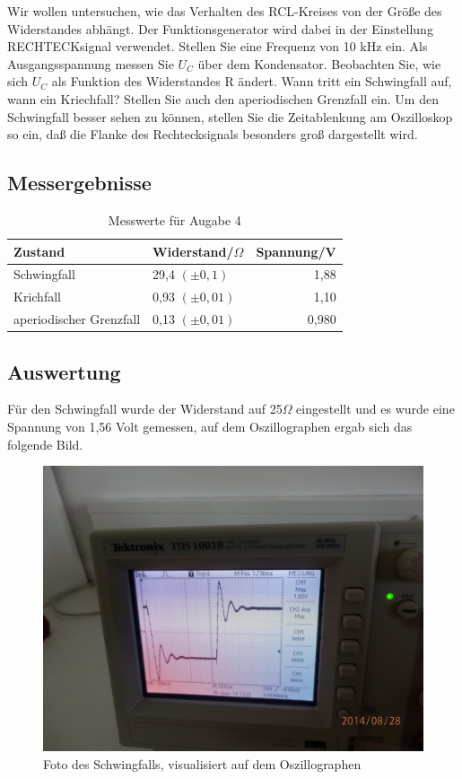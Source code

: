 \documentclass[12pt]{scrartcl}
\begin{document}
Wir wollen untersuchen, wie das Verhalten des RCL-Kreises von der Größe des Widerstandes abhängt. Der Funktionsgenerator wird dabei in der Einstellung RECHTECKsignal verwendet. Stellen Sie eine Frequenz von 10 kHz ein. Als Ausgangsspannung messen Sie
$U_C$ über dem Kondensator. Beobachten Sie, wie sich $U_C$
als Funktion des Widerstandes
R ändert. Wann tritt ein Schwingfall auf, wann ein Kriechfall? Stellen Sie auch den
aperiodischen Grenzfall ein. Um den Schwingfall besser sehen zu können, stellen Sie die Zeitablenkung am Oszilloskop so ein, daß die Flanke des Rechtecksignals besonders groß dargestellt wird.
\subsection{Messergebnisse}
\begin{table}[htbp]
 \centering
\caption{Messwerte für Augabe 4}
\begin{tabular}{|l|l|r|}
\hline
Zustand & Widerstand/$\Omega$ & \multicolumn{1}{l|}{Spannung/V} \\ \hline
Schwingfall & 29,4 $(\pm 0,1)$ & 1,88 \\ \hline
Krichfall & 0,93 $(\pm 0,01)$ & 1,10 \\ \hline
aperiodischer Grenzfall & 0,13 $(\pm 0,01)$ & 0,980 \\ \hline
\end{tabular}
\label{tab:aufgabe4}
\end{table}


\subsection{Auswertung}

Für den Schwingfall wurde der Widerstand auf 25$\Omega$ eingestellt und es wurde eine Spannung von 1,56 Volt gemessen, auf dem Oszillographen ergab sich das folgende Bild.
\begin{figure}[H] 
  \centering
    \includegraphics[scale = 0.1]{schwingfall.JPG}
  	\caption[Foto des Schwingfalls, visualisiert auf dem Oszillographen]{Foto des Schwingfalls, visualisiert auf dem Oszillographen}
  \label{fig:schwingfall}
\end{figure}
\end{document}
